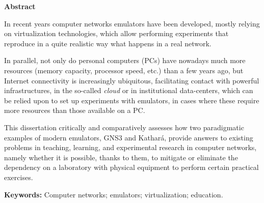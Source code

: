 
\cleardoublepage\thispagestyle{plain}

\textbf{\Large Abstract}

In recent years computer networks emulators have been developed, mostly relying on virtualization technologies, which allow performing experiments that reproduce in a quite realistic way what happens in a real network.

In parallel, not only do personal computers (PCs) have nowadays much more resources (memory capacity, processor speed, etc.) than a few years ago, but Internet connectivity is increasingly ubiquitous, facilitating contact with powerful infrastructures, in the so-called \emph{cloud} or in institutional data-centers, which can be relied upon to set up experiments with emulators, in cases where these require more resources than those available on a PC.

This dissertation critically and comparatively assesses how two paradigmatic examples of modern emulators, GNS3 and Kathará, provide answers to existing problems in teaching, learning, and experimental research in computer networks, namely whether it is possible, thanks to them, to mitigate or eliminate the dependency on a laboratory with physical equipment to perform certain practical exercises.

\textbf{Keywords:} Computer networks; emulators; virtualization; education.
